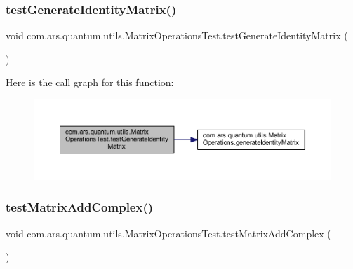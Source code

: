 \subsubsection{\texorpdfstring{test\+Generate\+Identity\+Matrix()}{testGenerateIdentityMatrix()}}
{\footnotesize\ttfamily void com.\+ars.\+quantum.\+utils.\+Matrix\+Operations\+Test.\+test\+Generate\+Identity\+Matrix (\begin{DoxyParamCaption}{ }\end{DoxyParamCaption})}

Here is the call graph for this function\+:\nopagebreak
\begin{figure}[H]
\begin{center}
\leavevmode
\includegraphics[width=350pt]{classcom_1_1ars_1_1quantum_1_1utils_1_1_matrix_operations_test_a97c53b085b9edf71d4b9488f19b6ba40_cgraph}
\end{center}
\end{figure}
\hypertarget{classcom_1_1ars_1_1quantum_1_1utils_1_1_matrix_operations_test_aad67e722c86ac9893a746e586e76e6c6}{}\label{classcom_1_1ars_1_1quantum_1_1utils_1_1_matrix_operations_test_aad67e722c86ac9893a746e586e76e6c6} 
\subsubsection{\texorpdfstring{test\+Matrix\+Add\+Complex()}{testMatrixAddComplex()}}
{\footnotesize\ttfamily void com.\+ars.\+quantum.\+utils.\+Matrix\+Operations\+Test.\+test\+Matrix\+Add\+Complex (\begin{DoxyParamCaption}{ }\end{DoxyParamCaption})}


